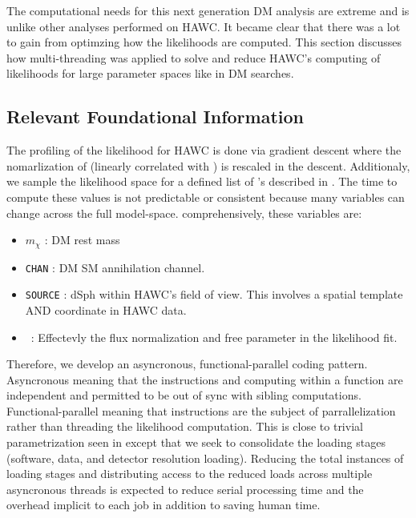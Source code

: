 The computational needs for this next generation DM analysis are extreme and is unlike other analyses performed on HAWC.
It became clear that there was a lot to gain from optimzing how the likelihoods are computed.
This section discusses how multi-threading was applied to solve and reduce HAWC's computing of likelihoods for large parameter spaces like in DM searches.

\subsection{Relevant Foundational Information}\label{sec:mtd_foundation}

The profiling of the likelihood for HAWC is done via gradient descent where the nomarlization of  (linearly correlated with \sv) is rescaled in the descent.
Additionaly, we sample the likelihood space for a defined list of \sv's described in .
The time to compute these values is not predictable or consistent because many variables can change across the full model-space.
comprehensively, these variables are:
\begin{itemize}
    \item $m_\chi$ : DM rest mass
    \item \texttt{CHAN} : DM SM annihilation channel.
    \item \texttt{SOURCE} : dSph within HAWC's field of view. This involves a spatial template AND coordinate in HAWC data.
    \item \sv~: Effectevly the flux normalization and free parameter in the likelihood fit.
\end{itemize}
Therefore, we develop an asyncronous, functional-parallel coding pattern.
Asyncronous meaning that the instructions and computing within a function are independent and permitted to be out of sync with sibling computations.
Functional-parallel meaning that instructions are the subject of parrallelization rather than threading the likelihood computation.
This is close to trivial parametrization seen in  except that we seek to consolidate the loading stages (software, data, and detector resolution loading).
Reducing the total instances of loading stages and distributing access to the reduced loads across multiple asyncronous threads is expected to reduce serial processing time and the overhead implicit to each job in addition to saving human time.


